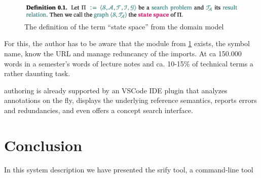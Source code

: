 \documentclass{llncs}
\newcommand\srf{\textsf{srify}\xspace}
\begin{document}
\begin{figure}[ht]\centering
  \includegraphics[width=12cm]{state-space}
  \caption{The definition of the term ``state space'' from the domain model}\label{fig:state-space}
\end{figure}

For this, the author has to be aware that the module from \cref{fig:state-space} exists,
the symbol name, know the URL and manage reduncancy of the imports. At ca 150.000 words in
a semester's words of lecture notes and ca. 10-15\% of technical terms a rather daunting
task.

\sTeX authoring is already supported by an VSCode IDE plugin \cite{sTeX-IDE:git} that
analyzes annotations on the fly, displays the underlying reference semantics, reports
errors and redundancies, and even offers a concept search interface. 

\section{Conclusion}

In this system description we have presented the \srf tool, a command-line tool 



\printbibliography
\end{document}
